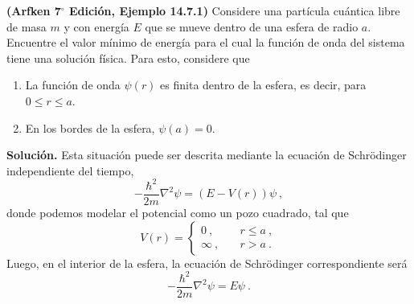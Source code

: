 



\begin{ejemplo}
    \textbf{(Arfken 7$^{\boldsymbol{\circ}}$ Edición, Ejemplo 14.7.1)} Considere una partícula cuántica libre de masa $m$ y con energía $E$ que se mueve dentro de una esfera de radio $a$. Encuentre el valor mínimo de energía para el cual la función de onda del sistema tiene una solución física. Para esto, considere que
    \begin{enumerate}
        \item La función de onda $\psi(r)$ es finita dentro de la esfera, es decir, para $0 \leq r \leq a$.
        \item En los bordes de la esfera, $\psi(a) = 0$.
    \end{enumerate} 

    \textbf{Solución.} Esta situación puede ser descrita mediante la ecuación de Schrödinger independiente del tiempo,
    \begin{equation*}
        - \frac{\hbar^2}{2m} \nabla^2 \psi = (E - V(r)) \psi \ ,
    \end{equation*}
    donde podemos modelar el potencial como un pozo cuadrado, tal que
    \begin{equation*}
        V(r) = \left\{ \begin{array}{cc}
            0 \ , & \quad r \leq a \ , \\
            \infty \ , & \quad r > a \ .
        \end{array} \right.
    \end{equation*}
    Luego, en el interior de la esfera, la ecuación de Schrödinger correspondiente será
    \begin{equation*}
        - \frac{\hbar^2}{2m} \nabla^2 \psi = E \psi \ .
    \end{equation*}
    

\end{ejemplo}
